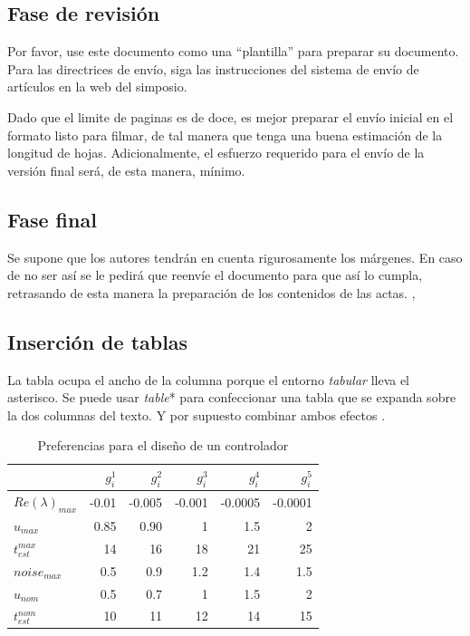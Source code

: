 \documentclass[5p,times,authoryear]{elsarticle}
\begin{document}
\subsection{Fase de revisión}

Por favor, use este documento como una ``plantilla'' para preparar su documento. Para las directrices de envío, siga las instrucciones del sistema de envío de artículos en la web del simposio.

Dado que el limite de paginas es de doce, es mejor preparar el envío inicial en el formato listo para filmar, de tal manera que tenga una buena estimación de la longitud de hojas. Adicionalmente, el esfuerzo requerido para el envío de la versión final será, de esta manera, mínimo.

\subsection{Fase final}

Se supone que los autores tendrán en cuenta rigurosamente los márgenes. En caso de no ser así se le pedirá que reenvíe el documento para que así lo cumpla, retrasando de esta manera la preparación de los contenidos de las actas. \citep{Baker1963}, \citep{Baker1963a}

\subsection{Inserción de tablas}
La tabla ocupa el ancho de la columna porque el entorno \emph{tabular} lleva el asterisco. Se puede usar \emph{table}* para confeccionar una tabla que se expanda sobre la dos columnas del texto. Y por supuesto combinar ambos efectos \citep{Charlie1966}.


\begin{table}[htbp]
  \caption{Preferencias para el diseño de un controlador}
   \label{extremos45}
  \begin{tabular*}{\hsize}{lrrrrr}
\hline
    & $g_i^1$ & $g_i^2$ & $g_i^3$ & $g_i^4$ & $g_i^5$ \\
    \hline
$Re(\lambda)_{max}$ & -0.01  & -0.005 & -0.001 & -0.0005 & -0.0001 \\
$u_{max}$& 0.85 & 0.90 & 1 & 1.5 & 2  \\
$t_{est}^{max}$& 14 & 16 & 18 & 21 & 25 \\
$noise_{max}$& 0.5 & 0.9 & 1.2 & 1.4 & 1.5  \\
$u_{nom}$& 0.5 & 0.7 & 1  & 1.5 & 2  \\
$t_{est}^{nom}$& 10 & 11 & 12 & 14 & 15 \\
\hline
  \end{tabular*}
\end{table}
\end{document}
